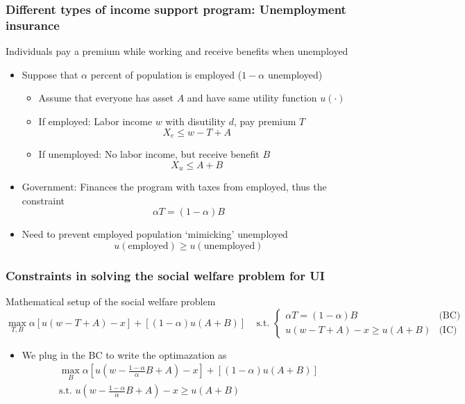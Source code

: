 \documentclass[aspectratio=169]{beamer}
\begin{document}
\begin{frame}
\frametitle{Different types of income support program: Unemployment insurance} 
Individuals pay a premium while working and receive benefits when unemployed
\begin{itemize}\setlength\itemsep{3pt}
\item Suppose that $\alpha$ percent of population is employed ($1-\alpha$ unemployed)
\begin{itemize}\setlength\itemsep{3pt}
  \item Assume that everyone has asset $A$ and have same utility function $u(\cdot)$
  \item If employed: Labor income $w$ with disutility $d$, pay premium $T$
  \[
  X_e \leq w-T+A
  \]
  \item If unemployed: No labor income, but receive benefit $B$
  \[
  X_u \leq A+B
  \]
\end{itemize}
\item Government: Finances the program with taxes from employed, thus the constraint
\[ 
\alpha T = (1-\alpha)B 
\]
\item Need to prevent employed population `mimicking' unemployed 
\[u(\text{employed})\geq u(\text{unemployed})\]
\end{itemize}\medskip
\end{frame}


\begin{frame}
\frametitle{Constraints in solving the social welfare problem for UI} 
Mathematical setup of the social welfare problem
\[
\max_{T,B} \alpha[u(w-T+A)-x] + [(1-\alpha)u(A+B)] \ \ \ \ \ \text{s.t.  } \begin{cases}
  \alpha T = (1-\alpha)B & \text{(BC)}\\
  u(w-T+A)-x \geq u(A+B) & \text{(IC)}
\end{cases}
\]
\begin{itemize}\setlength\itemsep{3pt}
\item We plug in the BC to write the optimazation as
\[
\begin{aligned}
\max_{B} \alpha\left[u\left(w-\frac{1-\alpha}{\alpha}B+A\right)-x\right] + [(1-\alpha)u(A+B)] \\
 \text{s.t.  } u\left(w-\frac{1-\alpha}{\alpha}B+A\right)-x \geq u(A+B) 
\end{aligned}
\]
\end{itemize}\medskip
\end{frame}
\end{document}
